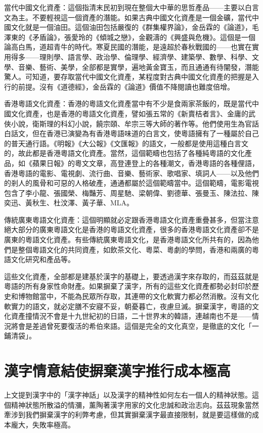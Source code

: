 \documentclass[a5paper, 10pt, openany]{book} %
\begin{document}
當代中國文化資產：這個指清末民初到現在整個大中華的思哲產品——主要以白言文為主。不要輕視這一個資產的潛能。如果古典中國文化資產是一個金礦，當代中國文化就是一個油田。這個油田包括嚴復的《群集權界論》，金岳霖的《論道》，毛澤東的《矛盾論》，張愛玲的《傾城之戀》，金觀濤的《興盛與危機》。這個是一個論高白馬，道超青牛的時代。寒夏民國的潛能，是遠超於春秋戰國的——也實在實用得多——理則學、語言學、政治學、倫理學、經濟學、建築學、數學、科學、文學、音樂、藝術、美學，全部都是實學，遍地黃金寶玉，而且通通有待闡發，潛能驚人。可知道，要存取當代中國文化資產，某程度對古典中國文化資產的把握是入行的前提。沒有《道德經》，金岳霖的《論道》價值不降閱讀也難度倍增。

香港粵語文化資產：香港的粵語文化資產當中有不少是食兩家茶飯的，既是當代中國文化資產，也是香港的粵語文化資產，譬如張五常的《新賣桔者言》、金庸的武俠小說，衛斯理的科幻小說，饒宗頤、牟宗三等大師的著作等。他們使用生為官話白話文，但在香港已演變為有香港粵語味道的白言文，使粵語擁有了一種屬於自己的普天通行語。《明報》《大公報》《文匯報》的語文，一般都是使用這種白言文的，故此都是香港粵語文化資產。當然，這個範疇也包括了各種純粵語的文化產品，如《蘋果日報》的粵文文章，高登連登上的各種潮文，香港粵語的各種俚語，香港粵語的電影、電視劇、流行曲、音樂、藝術家、歌唱家、填詞人——以及他們的剎人的風骨和可惡的人格破產，通通都屬於這個範疇當中。這個範疇，電影電視包含了李小龍、張國榮、梅豔芳、周星馳、梁朝偉、劉德華、張曼玉、陳法拉、陳奕迅、黃秋生、杜汶澤、黃子華、MLA。

傳統廣東粵語文化資產：這個明顯就必定跟香港粵語文化資產重疊甚多，但當注意絕大部分的廣東粵語文化是香港的粵語文化資產，很多的香港粵語文化資產卻不是廣東的粵語文化資產。有些傳統廣東粵語文化，是香港粵語文化所共有的，因為他們是整個粵語文化的共同資產，如飲茶文化、粵菜、粵劇的學問，香港和兩廣的粵語文化研究和產品等。

這些文化資產，全部都是建基於漢字的基礎上，要透過漢字來存取的，而茲茲就是粵語的所有身家性命財產。如果摒棄了漢字，所有的這些文化資產都勢必封印於歷史和博物館當中，不能為民眾所存取，其連帶的文化軟實力都必然消散。沒有文化軟實力的語文，就必定膳不安寢不妥，朝憂暮亡，夜慮旦滅。摒棄漢字，粵語的文化資產撞情況不會是十九世紀初的日語，二十世界末的韓語，連越南也不是——情況將會是差過曾死要復活的希伯來語。這個是完全的文化真空，是徹底的文化「一鋪清袋」。

\section{漢字情意結使摒棄漢字推行成本極高}

上文提到漢字中的「漢字神話」以及漢字的精神性如何左右一個人的精神狀態。這個精神狀態所散溢的情瀰，薰陶著漢字用家的文化忠誠和政治志向。茲茲現象當然牽涉到我們摒棄漢字的利弊考慮，但其實摒棄漢字最直接限制，就是要這樣做的成本龐大，失敗率極高。
\end{document}

